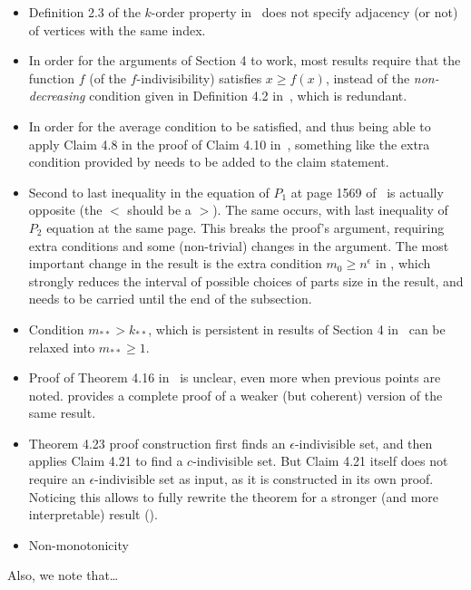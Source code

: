     \begin{itemize}
        \item Definition 2.3 of the $k$-order property in~\cite{regularity_lemmas_for_stable_graphs} does not
            specify adjacency (or not) of vertices with the same index.
        \item In order for the arguments of Section 4 to work, most results require that the function
            $f$ (of the $f$-indivisibility) satisfies $x \geq f(x)$, instead of the \emph{non-decreasing} condition
            given in Definition 4.2 in~\cite{regularity_lemmas_for_stable_graphs}, which is redundant.
        \item In order for the average condition to be satisfied, and thus being able to apply Claim 4.8 in the proof
            of Claim 4.10 in~\cite{regularity_lemmas_for_stable_graphs}, something like the extra condition provided
            by  needs to be added to the claim statement.
        \item Second to last inequality in the equation of $P_1$ at page 1569 of~\cite{regularity_lemmas_for_stable_graphs}
            is actually opposite (the $<$ should be a $>$).
            The same occurs, with last inequality of $P_2$ equation at the same page.
            This breaks the proof's argument, requiring extra conditions and some (non-trivial) changes in the argument.
            The most important change in the result is the extra condition $m_0 \geq n^\epsilon$ in
            , which strongly reduces the
            interval of possible choices of parts size in the result, and needs to be carried until the end of the subsection.
        \item Condition $m_{**} > k_{**}$, which is persistent in results of Section 4
            in~\cite{regularity_lemmas_for_stable_graphs} can be relaxed into $m_{**} \geq 1$.
        \item Proof of Theorem 4.16 in~\cite{regularity_lemmas_for_stable_graphs} is unclear, even more when previous points
            are noted.
             provides
            a complete proof of a weaker (but coherent) version of the same result.
        \item Theorem 4.23 proof construction first finds an $\epsilon$-indivisible set, and then applies Claim 4.21
            to find a $c$-indivisible set.
            But Claim 4.21 itself does not require an $\epsilon$-indivisible set as input, as it is constructed in its
            own proof.
            Noticing this allows to fully rewrite the theorem for a stronger (and more interpretable) result
            ().
        \item Non-monotonicity

    \end{itemize}
    Also, we note that\dots{}

